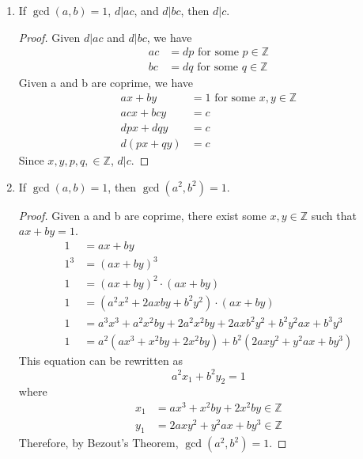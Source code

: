 \documentclass[letterpaper]{article}
\begin{document}
\begin{enumerate}
\begin{enumerate}
		\item If $\gcd(a, b) = 1$, $d | ac$, and $d | bc$, then $d | c$.
			\begin{proof}
				Given $d | ac$ and $d | bc$, we have
				\begin{align*}
					ac &= dp \text{ for some } p\in\mathbb{Z} \\
					bc &= dq \text{ for some } q\in\mathbb{Z}
				\end{align*} 
				Given a and b are coprime, we have
				\begin{align*}
					ax+by &= 1 \text{ for some } x,y\in\mathbb{Z} \\
					acx+bcy &= c \\
					dpx+dqy &= c \\
					d(px+qy) &= c
				\end{align*}
				Since $x,y,p,q,\in\mathbb{Z}$, $d|c$.
			\end{proof}

		\item If $\gcd(a, b) = 1$, then $\gcd(a^2, b^2) = 1$.
			\begin{proof}
				Given a and b are coprime, there exist some $x,y\in\mathbb{Z}$ such that
				$ax+by=1$.
				\begin{align*}
					1 &= ax + by \\
					1^3 &= (ax+by)^3 \\
					1 &= (ax+by)^2\cdot (ax+by) \\
					1 &= (a^2x^2+2axby+b^2y^2)\cdot (ax+by) \\
					1 &= a^3x^3 + a^2x^2by + 2a^2x^2by + 2axb^2y^2 + b^2y^2ax + b^3y^3 \\
					1 &= a^2(ax^3 + x^2by + 2x^2by) + b^2(2axy^2 + y^2ax + by^3)
				\end{align*}
				This equation can be rewritten as 
				\[ a^2x_1 + b^2y_2 = 1 \]
				where 
				\begin{align*}
					x_1 &= ax^3 + x^2by + 2x^2by \in\mathbb{Z} \\
					y_1 &= 2axy^2 + y^2ax + by^3 \in\mathbb{Z}
				\end{align*}
				Therefore, by Bezout's Theorem, $\gcd(a^2, b^2) = 1$.
			\end{proof}

	\end{enumerate}


\end{enumerate}
\end{document}

